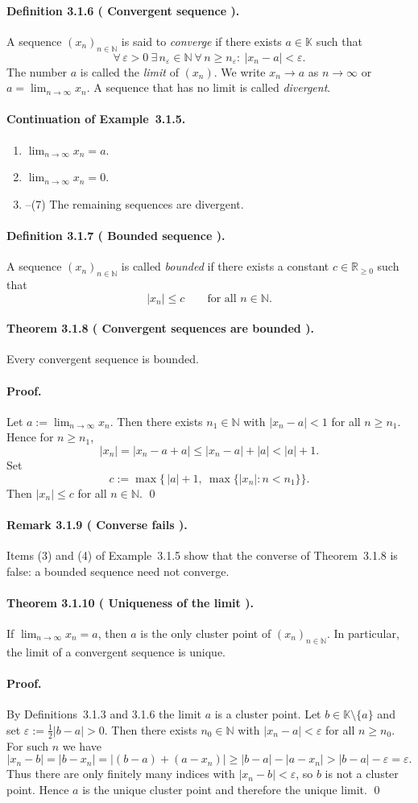 \documentclass[12pt]{article}
\newcommand{\N}{\mathbb{N}}
\newcommand{\R}{\mathbb{R}}
\newcommand{\K}{\mathbb{K}} %
\newcommand{\eps}{\varepsilon}
\newcommand{\NumberedDefinition}[3]{%
\paragraph*{Definition #1 ( #2 ).} #3\par}
\newcommand{\NumberedTheorem}[3]{%
\paragraph*{Theorem #1 ( #2 ).} #3\par}
\newcommand{\NumberedRemark}[3]{%
\paragraph*{Remark #1 ( #2 ).} #3\par}
\begin{document}
\NumberedDefinition{3.1.6}{Convergent sequence}{A sequence $(x_n)_{n\in\N}$ is said to \emph{converge} if there exists $a\in\K$ such that
\[
	\forall\,\eps>0\ \exists\, n_\eps\in\N\ \forall\, n\ge n_\eps:\ |x_n-a|<\eps.
\]
The number $a$ is called the \emph{limit} of $(x_n)$. We write $x_n\to a$ as $n\to\infty$ or $a=\lim_{n\to\infty} x_n$. A sequence that has no limit is called \emph{divergent}.}

\paragraph{Continuation of Example~3.1.5.}
\begin{enumerate}[label={(\arabic*)}, leftmargin=*]
	\item $\lim_{n\to\infty} x_n=a$.
	\item $\lim_{n\to\infty} x_n=0$.
	\item--(7) The remaining sequences are divergent.
\end{enumerate}

\NumberedDefinition{3.1.7}{Bounded sequence}{A sequence $(x_n)_{n\in\N}$ is called \emph{bounded} if there exists a constant $c\in\R_{\ge 0}$ such that
\[
	|x_n|\le c \qquad \text{for all } n\in\N.
\]}

\NumberedTheorem{3.1.8}{Convergent sequences are bounded}{Every convergent sequence is bounded.}

\paragraph{Proof.} Let $a:=\lim_{n\to\infty} x_n$. Then there exists $n_1\in\N$ with $|x_n-a|<1$ for all $n\ge n_1$. Hence for $n\ge n_1$,
\[
	|x_n| = |x_n-a+a| \le |x_n-a| + |a| < |a|+1.
\]
Set
\[
	c := \max\big\{\, |a|+1,\ \max\{ |x_n| : n<n_1\}\big\}.
\]
Then $|x_n|\le c$ for all $n\in\N$. \qed

\NumberedRemark{3.1.9}{Converse fails}{Items (3) and (4) of Example~3.1.5 show that the converse of Theorem~3.1.8 is false: a bounded sequence need not converge.}

\NumberedTheorem{3.1.10}{Uniqueness of the limit}{If $\lim_{n\to\infty} x_n = a$, then $a$ is the only cluster point of $(x_n)_{n\in\N}$. In particular, the limit of a convergent sequence is unique.}

\paragraph{Proof.} By Definitions~3.1.3 and 3.1.6 the limit $a$ is a cluster point. Let $b\in\K\setminus\{a\}$ and set $\eps := \tfrac12 |b-a|>0$. Then there exists $n_0\in\N$ with $|x_n-a|<\eps$ for all $n\ge n_0$. For such $n$ we have
\[
	|x_n-b| = |b-x_n| = |(b-a)+(a-x_n)| \ge |b-a| - |a-x_n| > |b-a|-\eps = \eps.
\]
Thus there are only finitely many indices with $|x_n-b|<\eps$, so $b$ is not a cluster point. Hence $a$ is the unique cluster point and therefore the unique limit. \qed
\end{document}
